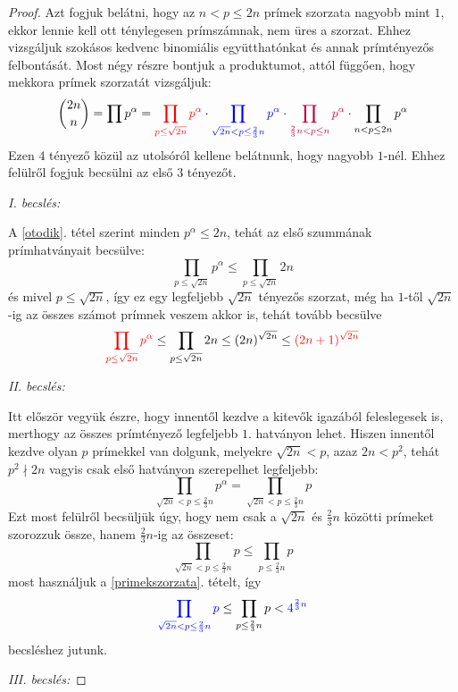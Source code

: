 \documentclass[12pt]{book}
\theoremstyle{plain} %
\theoremstyle{definition} %
\theoremstyle{remark}
\numberwithin{equation}{section}  %
\begin{document}
	\begin{proof}
		Azt fogjuk belátni, hogy az $n<p\leq 2n$ prímek szorzata nagyobb mint $1$, ekkor lennie kell ott ténylegesen prímszámnak, nem üres a szorzat. Ehhez vizsgáljuk szokásos kedvenc binomiális együtthatónkat és annak prímtényezős felbontását. Most négy részre bontjuk a produktumot, attól függően, hogy mekkora prímek szorzatát vizsgáljuk:
		\[ {2n\choose n} = \prod p^\alpha = \color{red} \prod_{p\leq \sqrt{2n}} p^\alpha \color{black} \cdot \color{blue} \prod_{\sqrt{2n}< p \leq \frac{2}{3}n} p^\alpha \color{black} \cdot \color{purple} \prod_{\frac{2}{3}n<p\leq n} p^\alpha \color{black} \cdot \prod_{n<p\leq 2n} p^\alpha \]
		Ezen $4$ tényező közül az utolsóról kellene belátnunk, hogy nagyobb $1$-nél. Ehhez felülről fogjuk becsülni az első 3 tényezőt.
		
		\textit{I. becslés:}
		
		A \ref{otodik}. tétel szerint minden $p^{\alpha} \leq 2n$, tehát az első szummának prímhatványait becsülve:
		\[ \prod_{p\leq \sqrt{2n}} p^\alpha  \leq \prod_{p\leq \sqrt{2n}} 2n   \]
		és mivel $p\leq \sqrt{2n}$, így ez egy legfeljebb $\sqrt{2n}$ tényezős szorzat, még ha $1$-től $\sqrt{2n}$-ig az összes számot prímnek veszem akkor is, tehát tovább becsülve
		\[ \color{red} \prod_{p\leq \sqrt{2n}} p^\alpha \color{black} \leq \prod_{p\leq \sqrt{2n}} 2n \leq (2n)^{\sqrt{2n}} \leq \color{red} (2n+1)^{\sqrt{2n}} \color{black} \]
		
		\textit{II. becslés:}
		
		Itt először vegyük észre, hogy innentől kezdve a kitevők igazából feleslegesek is, merthogy az összes prímtényező legfeljebb $1$. hatványon lehet. Hiszen innentől kezdve olyan $p$ prímekkel van dolgunk, melyekre $\sqrt{2n}<p$, azaz $2n<p^2$, tehát $p^2\nmid 2n$ vagyis csak első hatványon szerepelhet legfeljebb:
		\[ \prod_{\sqrt{2n}< p \leq \frac{2}{3}n} p^\alpha = \prod_{\sqrt{2n}< p \leq \frac{2}{3}n} p  \]
		Ezt most felülről becsüljük úgy, hogy nem csak a $\sqrt{2n}$ és $\frac{2}{3}n$ közötti prímeket szorozzuk össze, hanem $\frac{2}{3}n$-ig az összeset:
		\[ \prod_{\sqrt{2n}< p \leq \frac{2}{3}n} p \leq \prod_{p \leq \frac{2}{3}n} p  \]
		most használjuk a \ref{primekszorzata}. tételt, így
		\[ \color{blue} \prod_{\sqrt{2n}< p  \leq \frac{2}{3}n} p \color{black} \leq \prod_{p \leq \frac{2}{3}n} p < \color{blue} 4^{\frac{2}{3}n} \color{black}  \]
		becsléshez jutunk.
		
		\textit{III. becslés:}
		

\end{proof}
\end{document}
